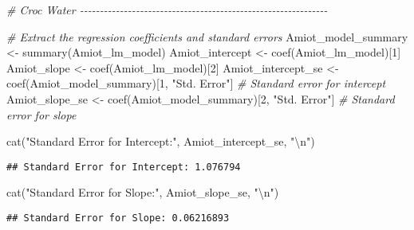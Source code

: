 \documentclass[
]{article}
\newenvironment{Shaded}{\begin{snugshade}}{\end{snugshade}}
\newcommand{\CommentTok}[1]{\textcolor[rgb]{0.56,0.35,0.01}{\textit{#1}}}
\newcommand{\DecValTok}[1]{\textcolor[rgb]{0.00,0.00,0.81}{#1}}
\newcommand{\FunctionTok}[1]{\textcolor[rgb]{0.00,0.00,0.00}{#1}}
\newcommand{\NormalTok}[1]{#1}
\newcommand{\OtherTok}[1]{\textcolor[rgb]{0.56,0.35,0.01}{#1}}
\newcommand{\SpecialCharTok}[1]{\textcolor[rgb]{0.00,0.00,0.00}{#1}}
\newcommand{\StringTok}[1]{\textcolor[rgb]{0.31,0.60,0.02}{#1}}
\begin{document}
\begin{Shaded}
\begin{Highlighting}[]
\CommentTok{\# Croc Water {-}{-}{-}{-}{-}{-}{-}{-}{-}{-}{-}{-}{-}{-}{-}{-}{-}{-}{-}{-}{-}{-}{-}{-}{-}{-}{-}{-}{-}{-}{-}{-}{-}{-}{-}{-}{-}{-}{-}{-}{-}{-}{-}{-}{-}{-}{-}{-}{-}{-}{-}{-}{-}{-}{-}{-}{-}{-}{-}{-}{-}{-}}

\CommentTok{\# Extract the regression coefficients and standard errors}
\NormalTok{Amiot\_model\_summary }\OtherTok{\textless{}{-}} \FunctionTok{summary}\NormalTok{(Amiot\_lm\_model)}
\NormalTok{Amiot\_intercept }\OtherTok{\textless{}{-}} \FunctionTok{coef}\NormalTok{(Amiot\_lm\_model)[}\DecValTok{1}\NormalTok{]}
\NormalTok{Amiot\_slope }\OtherTok{\textless{}{-}} \FunctionTok{coef}\NormalTok{(Amiot\_lm\_model)[}\DecValTok{2}\NormalTok{]}
\NormalTok{Amiot\_intercept\_se }\OtherTok{\textless{}{-}} \FunctionTok{coef}\NormalTok{(Amiot\_model\_summary)[}\DecValTok{1}\NormalTok{, }\StringTok{"Std. Error"}\NormalTok{]  }\CommentTok{\# Standard error for intercept}
\NormalTok{Amiot\_slope\_se }\OtherTok{\textless{}{-}} \FunctionTok{coef}\NormalTok{(Amiot\_model\_summary)[}\DecValTok{2}\NormalTok{, }\StringTok{"Std. Error"}\NormalTok{]      }\CommentTok{\# Standard error for slope}

\FunctionTok{cat}\NormalTok{(}\StringTok{"Standard Error for Intercept:"}\NormalTok{, Amiot\_intercept\_se, }\StringTok{"}\SpecialCharTok{\textbackslash{}n}\StringTok{"}\NormalTok{)}
\end{Highlighting}
\end{Shaded}

\begin{verbatim}
## Standard Error for Intercept: 1.076794
\end{verbatim}

\begin{Shaded}
\begin{Highlighting}[]
\FunctionTok{cat}\NormalTok{(}\StringTok{"Standard Error for Slope:"}\NormalTok{, Amiot\_slope\_se, }\StringTok{"}\SpecialCharTok{\textbackslash{}n}\StringTok{"}\NormalTok{)}
\end{Highlighting}
\end{Shaded}

\begin{verbatim}
## Standard Error for Slope: 0.06216893
\end{verbatim}
\end{document}
